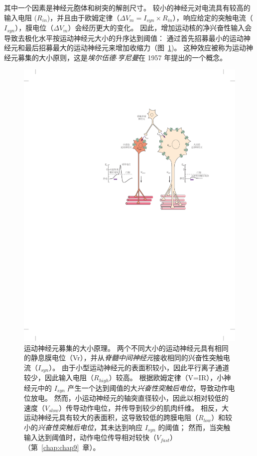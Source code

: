 其中一个因素是神经元胞体和树突的解剖尺寸。
较小的神经元对电流具有较高的输入电阻 ($ R_{in} $)，并且由于欧姆定律（$ \Delta V_m = I_{syn} \times R_{in} $），响应给定的突触电流（$ I_{syn} $），膜电位（$ \Delta V_m $）会经历更大的变化。
因此，增加运动核的净兴奋性输入会导致去极化水平按运动神经元大小的升序达到阈值：
通过首先招募最小的运动神经元和最后招募最大的运动神经元来增加收缩力（图~\ref{fig:31_6})。
这种效应被称为运动神经元募集的大小原则，这是\textit{埃尔伍德$\cdot$亨尼曼}在 1957 年提出的一个概念。


\begin{figure}[htbp]
	\centering
	\includegraphics[width=0.78\linewidth]{chap31/fig_31_6}
	\caption{运动神经元募集的大小原理。
	两个不同大小的运动神经元具有相同的静息膜电位（Vr），并从\textit{脊髓中间神经元}接收相同的兴奋性突触电流（$ I_{syn} $）。
	由于小型运动神经元的表面积较小，因此平行离子通道较少，因此输入电阻（$ R_{high} $）较高。
	根据欧姆定律（V=IR），小神经元中的 $ I_{syn} $ 产生一个达到阈值的大\textit{兴奋性突触后电位}，导致动作电位放电。
	然而，小运动神经元的轴突直径较小，因此以相对较低的速度（$ V_{slow} $）传导动作电位，并传导到较少的肌肉纤维。
	相反，大运动神经元具有较大的表面积，这导致较低的跨膜电阻（$R_{low}$）和较小的\textit{兴奋性突触后电位}，其未达到响应 $ I_{syn} $ 的阈值；
	然而，当突触输入达到阈值时，动作电位传导相对较快（$ V_{fast} $）（第~\ref{chap:chap9}~章）。}
	\label{fig:31_6}
\end{figure}


